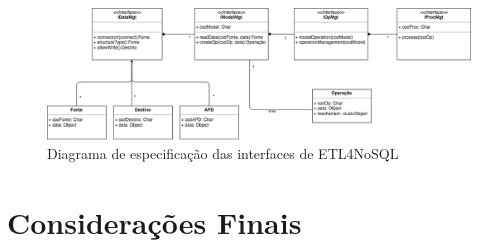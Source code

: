 \begin{figure}[h!]
	\centering
	\includegraphics[scale=0.4]{fig/interfaces.png}
	\caption{Diagrama de especificação das interfaces de ETL4NoSQL}
	\label{interfaces}
\end{figure}









\section{Considerações Finais}


